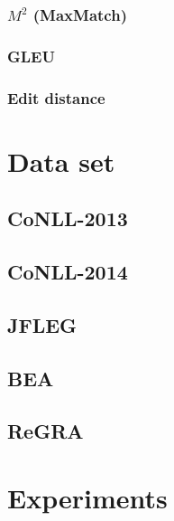 \documentclass{article}
\begin{document}
\subsubsection{$M^2$ (MaxMatch)}

\subsubsection{GLEU}

\subsubsection{Edit distance}

\section{Data set}

\subsection{CoNLL-2013}

\subsection{CoNLL-2014}

\subsection{JFLEG}

\subsection{BEA}

\subsection{ReGRA}


\section{Experiments}
\end{document}
